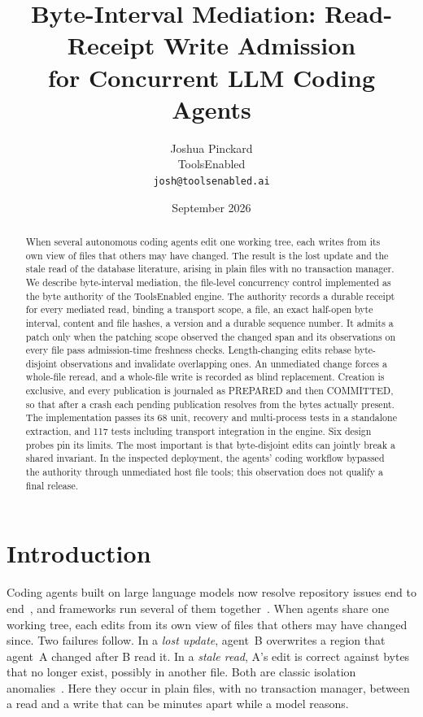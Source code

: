 \documentclass[10pt]{article}
\title{Byte-Interval Mediation: Read-Receipt Write Admission\\for Concurrent LLM Coding Agents}
\author{Joshua Pinckard\\ToolsEnabled\\\texttt{josh@toolsenabled.ai}}
\date{September 2026}
\begin{document}
\maketitle

\begin{abstract}
When several autonomous coding agents edit one working tree, each writes from its own view of files that others may have changed. The result is the lost update and the stale read of the database literature, arising in plain files with no transaction manager. We describe byte-interval mediation, the file-level concurrency control implemented as the byte authority of the ToolsEnabled engine. The authority records a durable receipt for every mediated read, binding a transport scope, a file, an exact half-open byte interval, content and file hashes, a version and a durable sequence number. It admits a patch only when the patching scope observed the changed span and its observations on every file pass admission-time freshness checks. Length-changing edits rebase byte-disjoint observations and invalidate overlapping ones. An unmediated change forces a whole-file reread, and a whole-file write is recorded as blind replacement. Creation is exclusive, and every publication is journaled as PREPARED and then COMMITTED, so that after a crash each pending publication resolves from the bytes actually present. The implementation passes its 68 unit, recovery and multi-process tests in a standalone extraction, and 117 tests including transport integration in the engine. Six design probes pin its limits. The most important is that byte-disjoint edits can jointly break a shared invariant. In the inspected deployment, the agents' coding workflow bypassed the authority through unmediated host file tools; this observation does not qualify a final release.
\end{abstract}

\section{Introduction}

Coding agents built on large language models now resolve repository issues end to end~\citep{jimenez2024swebench,yang2024sweagent,wang2025openhands,xia2024agentless,zhang2024autocoderover}, and frameworks run several of them together~\citep{hong2024metagpt,qian2024chatdev,wu2023autogen}. When agents share one working tree, each edits from its own view of files that others may have changed since. Two failures follow. In a \emph{lost update}, agent~B overwrites a region that agent~A changed after B read it. In a \emph{stale read}, A's edit is correct against bytes that no longer exist, possibly in another file. Both are classic isolation anomalies~\citep{berenson1995critique,adya1999weak}. Here they occur in plain files, with no transaction manager, between a read and a write that can be minutes apart while a model reasons.
\end{document}
